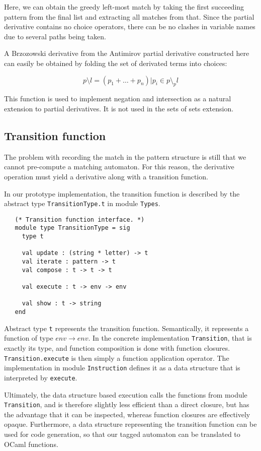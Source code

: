 Here, we can obtain the greedy left-most match by taking the first succeeding
pattern from the final list and extracting all matches from that. Since the
partial derivative contains no choice operators, there can be no clashes in
variable names due to several paths being taken.

A Brzozowski derivative from the Antimirov partial derivative constructed here
can easily be obtained by folding the set of derivated terms into choices:

\[p \setminus l = (p_1 + \dots + p_n) | p_i \in p \setminus_p l \]

This function is used to implement negation and intersection as a natural
extension to partial derivatives. It is not used in the sets of sets extension.

\subsection{Transition function}

The problem with recording the match in the pattern structure is still that we
cannot pre-compute a matching automaton. For this reason, the derivative
operation must yield a derivative along with a transition function.

In our prototype implementation, the transition function is described by the
abstract type \texttt{TransitionType.t} in module \texttt{Types}.

\begin{lstlisting}
   (* Transition function interface. *)
   module type TransitionType = sig
     type t

     val update : (string * letter) -> t
     val iterate : pattern -> t
     val compose : t -> t -> t

     val execute : t -> env -> env

     val show : t -> string
   end
\end{lstlisting}

Abstract type \texttt{t} represents the transition function. Semantically, it
represents a function of type $\mathit{env} \to \mathit{env}$. In the concrete
implementation \texttt{Transition}, that is exactly its type, and function
composition is done with function closures. \texttt{Transition.execute} is then
simply a function application operator. The implementation in module
\texttt{Instruction} defines it as a data structure that is interpreted by
\texttt{execute}.

Ultimately, the data structure based execution calls the functions from module
\texttt{Transition}, and is therefore slightly less efficient than a direct
closure, but has the advantage that it can be inspected, whereas function
closures are effectively opaque. Furthermore, a data structure representing the
transition function can be used for code generation, so that our tagged
automaton can be translated to OCaml functions.

